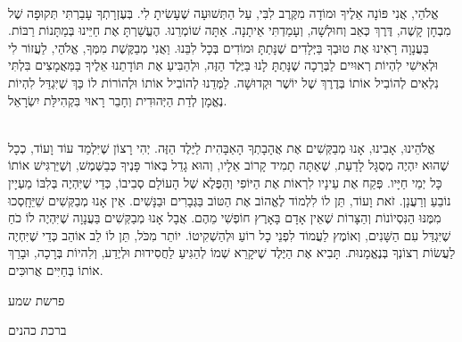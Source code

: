 \documentclass[14pt, article, extrafontsizes, twopage, a4paper]{memoir}
\begin{document}
\\
אֱלֹהַי,
אֲנִי פּוֹנָה אֵלֶיךָ וּמוֹדָה מִקֶּרֶב לִבִּי,
עַל הַתְּשׁוּעָה שֶׁעָשִׂיתָ לִי.
בְּעֶזְרָתְךָ עָבַרְתִּי תְּקוּפָה שֶׁל מִבְחָן קָשֶׁה,
דֶּרֶךְ כְּאֵב וְחוּלְשָׁה, וְעָמַדְתִּי אֵיתָנָה.
אַתָּה שׁוֹמְרֵנוּ.
הֶעֱשַׁרְתָּ אֶת חַיֵּינוּ בְּמַתָּנוֹת רַבּוֹת.
בַּעֲנָוָה רָאִינוּ אֶת טוּבְךָ בַּיְּלָדִים שֶׁנָּתַתָּ
וּמוֹדִים בְּכָל לִבֵּנוּ.
וַאֲנִי מְבַקֶּשֶׁת מִמְּךָ, אֱלֹהַי,
לַעֲזוֹר לִי וּלְאִישִׁי
לִהְיוֹת רְאוּיִים לַבְּרָכָה
שֶׁנָּתַתָּ לָנוּ בַּיֶּלֶד הַזֶּה,
וּלְהַבִּיעַ אֶת תּוֹדָתֵנוּ אֵלֶיךָ
בַּמַּאֲמָצִים בִּלְתִּי נִלְאִים לְהוֹבִיל אוֹתוֹ
בְּדֶרֶךְ שֶׁל יוֹשֶׁר וּקְדוּשָׁה.
לַמְּדֵנוּ לְהוֹבִיל אוֹתוֹ וּלְהוֹרוֹת לוֹ
כַּךְ שֶׁיִּגְדַּל לִהְיוֹת נֶאֱמָן לְדַת הַיְּהוּדִית 
וְחָבֵר רָאוּי בִּקְהִילַּת יִשְׂרָאֵל.

\\
אֱלֹהֵינוּ, אָבִינוּ,
אָנוּ מְבַקְּשִׁים אֶת אֲהָבָתְךָ הָאַבָּהִית לַיֶּלֶד הַזֶּה.
יְהִי רָצוֹן שֶׁיִּלְמַד עוֹד וָעוֹד,
כְכָל שֶׁהוּא יִהְיֶה מְסֻגָּל לָדַעַת,
שֶׁאַתָּה תָמִיד קָרוֹב אֵלָיו,
וְהוּא גָדֵל בְּאוֹר פָּנֶיךָ כְּבַשֶּׁמֶשׁ,
וְשֶׁיַּרְגִּישׁ אוֹתוֹ כָּל יְמֵי חַיָּיו.
פְּקַח אֶת עֵינָיו לִרְאוֹת אֶת הַיּוֹפִי וְהַפֶּלֶא שֶׁל הָעוֹלָם סְבִיבוֹ,
כְּדֵי שֶׁיִּהְיֶה בְּלִבּוֹ מַעְיָין נוֹבֵעַ וְרַעֲנָן.
זֹאת וָעוֹד,
תֵּן לוֹ לִלְמוֹד לֶאֱהוֹב אֶת הַטּוֹב בַּגְּבָרִים וּבַנָּשִׁים.
אֵין אָנוּ מְבַקְּשִׁים שֵׁיֵּחָֽסְכוּ מִמֶּנּוּ הַנִּסְיוֹנוֹת וְהַצָּרוֹת
שֶׁאֵין אָדָם בָּאָרֶץ חוֹפְשִׁי מֵהֶם.
אֲבָל אָנוּ מְבַקְּשִׁים בַּעֲנָוָה שֶׁיִּהְיֶה לוֹ כֹחַ שֶׁיִּגְדַּל עִם הַשָּׁנִים,
וְאוֹמֶץ לַעֲמוֹד לִפְנֵי כָל רוֹעַ וּלְהַשְׁקִיטוֹ.
יוֹתֵר מִכֹּל, תֵּן לוֹ לֵב אוֹהֵב כְּדֵי שֶׁיִּחְיֶה לַעֲשׂוֹת רְצוֹנְךָ בְּנֶאֱמָנוּת.
תָּבִיא אֶת הַיֶּלֶד שֶׁיּקָרֵא שְׁמוֹ 
לְהַגִּיעַ לַחֲסִידוּת וּלְיֶדַע,
וְלִהיוֹת בְּרָכָה,
וּבָרֵךְ אוֹתוֹ בְּחַיִּים אֲרוּכִּים.

{\centering\larger[2]
  פרשת שמע

 ברכת כהנים

}
\end{document}
